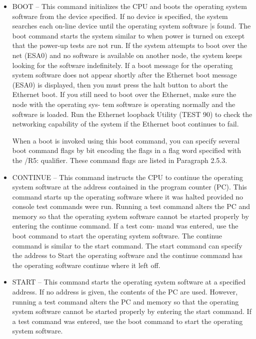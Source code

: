 \begin{itemize}
\item BOOT -- This command initializes the CPU and boots the operating 
system software from the device specified. If no device is specified, the
system searches each on-line device until the operating system software
|s found. The boot command starts the system similar to when power
is turned on except that the power-up tests are not run. If the system
attempts to boot over the net (ESA0) and no software is available on
another node, the system keeps looking for the software indefinitely.
If a boot message for the operating system software does not appear
shortly after the Ethernet boot message (ESA0) is displayed, then you
must press the halt button to abort the Ethernet boot. If you still need
to boot over the Ethernet, make sure the node with the operating sys-
tem software is operating normally and the software is loaded. Run the
Ethernet loopback Utility (TEST 90) to check the networking capability
of the system if the Ethernet boot continues to fail.

When a boot is invoked using this boot command, you can specify
several boot command flags by bit encoding the flags in a flag word
specified with the /R5: qualifier. These command flags are listed in
Paragraph 2.5.3.

\item CONTINUE -- This command instructs the CPU to continue the 
operating system software at the address contained in the program counter
(PC). This command starts up the operating software where it was halted
provided no console test commands were run. Running a test command
alters the PC and memory so that the operating system software cannot
be started properly by entering the continue command. If a test com-
mand was entered, use the boot command to start the operating system
software. The continue command is similar to the start command. The
start command can specify the address to Start the operating software
and the continue command has the operating software continue where
it left off.

\item START -- This command starts the operating system software at a 
specified address. If no address is given, the contents of the PC are used.
However, running a test command alters the PC and memory so that the
operating system software cannot be started properly by entering the
start command. If a test command was entered, use the boot command
to start the operating system software.

\end{itemize}

